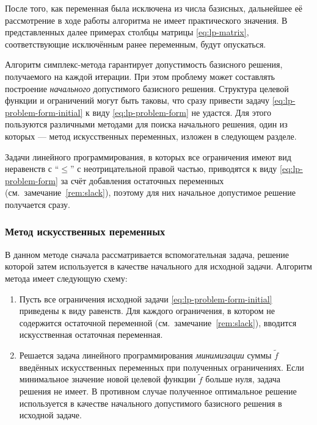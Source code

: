 \begin{rem}
  \label{rem:omitting-free}
  После того, как переменная была исключена из числа базисных,
  дальнейшее её рассмотрение в ходе работы алгоритма не имеет
  практического значения. В представленных далее примерах столбцы
  матрицы \eqref{eq:lp-matrix}, соответствующие исключённым ранее
  переменным, будут опускаться.
\end{rem}

Алгоритм симплекс-метода гарантирует допустимость базисного решения,
получаемого на каждой итерации. При этом проблему может составлять
построение \emph{начального} допустимого базисного решения. Структура
целевой функции и ограничений могут быть таковы, что сразу привести
задачу \eqref{eq:lp-problem-form-initial} к виду
\eqref{eq:lp-problem-form} не удастся. Для этого пользуются различными
методами для поиска начального решения, один из которых — метод
искусственных переменных, изложен в следующем разделе.

\begin{rem}
  \label{rem:slack-solution}
  Задачи линейного программирования, в которых все ограничения имеют
  вид неравенств с ``$\leq$'' с неотрицательной правой частью,
  приводятся к виду \eqref{eq:lp-problem-form} за счёт добавления
  остаточных переменных (см. замечание \ref{rem:slack}), поэтому для
  них начальное допустимое решение получается сразу.
\end{rem}

\subsubsection{Метод искусственных переменных}

В данном методе сначала рассматривается вспомогательная задача,
решение которой затем используется в качестве начального для исходной
задачи. Алгоритм метода имеет следующую схему:

\begin{enumerate}
  \renewcommand{\labelenumi}{\textbf{Шаг \arabic{enumi}.}}
\item Пусть все ограничения исходной задачи
  \eqref{eq:lp-problem-form-initial} приведены к виду равенств. Для
  каждого ограничения, в котором не содержится остаточной переменной
  (см. замечание \ref{rem:slack}), вводится искусственная остаточная
  переменная.
\item Решается задача линейного программирования \emph{минимизации}
  суммы $\tilde{f}$ введённых искусственных переменных при полученных
  ограничениях. Если минимальное значение новой целевой функции
  $\tilde{f}$ больше нуля, задача решения не имеет. В противном случае
  полученное оптимальное решение используется в качестве начального
  допустимого базисного решения в исходной задаче.
\end{enumerate}

